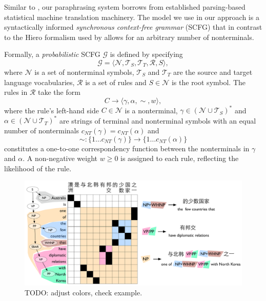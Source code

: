 \documentclass[11pt]{article}
\begin{document}
Similar to , our paraphrasing system borrows from
established parsing-based statistical machine translation
machinery. The model we use in our approach is a syntactically
informed \emph{ synchronous context-free grammar} (SCFG) that in
contrast to the Hiero formalism used by  allows
for an arbitrary number of nonterminals.

Formally, a \emph{probabilistic} SCFG $\mathcal{G}$ is defined by
specifying
\[
\mathcal{G} = \langle \mathcal{N}, \mathcal{T}_S, \mathcal{T}_T,
\mathcal{R}, S \rangle ,
\]
where $\mathcal{N}$ is a set of nonterminal symbols, $\mathcal{T}_S$
and $\mathcal{T}_T$ are the source and target language vocabularies,
$\mathcal{R}$ is a set of rules and $S \in \mathcal{N}$ is the root
symbol. The rules in $\mathcal{R}$ take the form
\begin{equation*}
  C \rightarrow \langle \gamma, \alpha, \sim, w \rangle ,
\end{equation*}
where the rule's left-hand side $C \in \mathcal{N}$ is a nonterminal,
$\gamma \in (\mathcal{N} \cup \mathcal{T}_S)^*$ and $\alpha \in
(\mathcal{N} \cup \mathcal{T}_T)^*$ are strings of terminal and
nonterminal symbols with an equal number of nonterminals
$c_{\mathit{NT}}(\gamma) = c_{\mathit{NT}}(\alpha)$ and 
$$
\sim : \{1 \ldots c_{\mathit{NT}}(\gamma)\} \rightarrow \{1 \ldots
c_{\mathit{NT}}(\alpha)\}
$$ 
constitutes a one-to-one correspondency function between the
nonterminals in $\gamma$ and $\alpha$. A non-negative weight $w \geq
0$ is assigned to each rule, reflecting the likelihood of the rule.

\begin{figure}[t]
\begin{center}
\includegraphics[width=0.99\linewidth]{figures/scfg_grid_revamp.pdf}
\end{center}
\caption{TODO: adjust colors, check example.}
\label{samt_extraction}
\end{figure}
\end{document}
